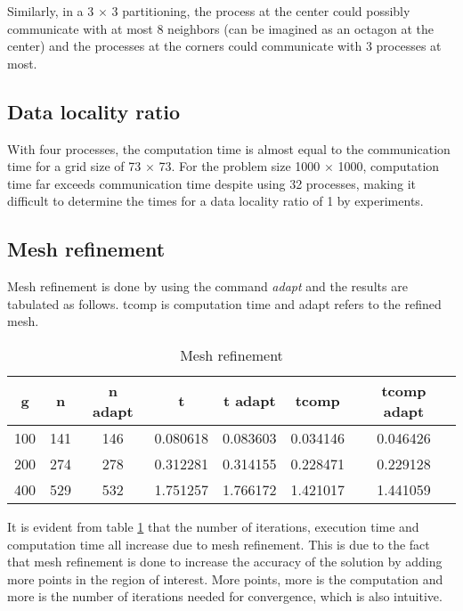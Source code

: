 Similarly, in a 3 $ \times $ 3 partitioning, the process at the center could possibly communicate with at most 8 neighbors (can be imagined as an octagon at the center) and the processes at the corners could communicate with 3 processes at most. 

\subsection{Data locality ratio}
With four processes, the computation time is almost equal to the communication time for a grid size of 73 $ \times $ 73. For the problem size 1000 $ \times $ 1000, computation time far exceeds communication time despite using 32 processes, making it difficult to determine the times for a data locality ratio of 1 by experiments. 

\subsection{Mesh refinement}
Mesh refinement is done by using the command \textit{adapt} and the results are tabulated as follows. tcomp is computation time and adapt refers to the refined mesh. 

\begin{table}[h!]
  \centering
  \begin{tabular}{|c|c|c|c|c|c|c|}
    \hline
    g & n & n adapt & t & t adapt & tcomp & tcomp adapt \\
    \hline
    100 & 141 & 146	& 0.080618  & 0.083603 & 0.034146 & 0.046426 \\	
    200 & 274 & 278	& 0.312281  & 0.314155 & 0.228471 & 0.229128 \\
    400 & 529 & 532	& 1.751257	& 1.766172 & 1.421017 & 1.441059 \\   
    \hline	
  \end{tabular}
  \caption{Mesh refinement}
  \label{adapt}
\end{table}

It is evident from table \ref{adapt} that the number of iterations, execution time and computation time all increase due to mesh refinement. This is due to the fact that mesh refinement is done to increase the accuracy of the solution by adding more points in the region of interest. More points, more is the computation and more is the number of iterations needed for convergence, which is also intuitive. 
